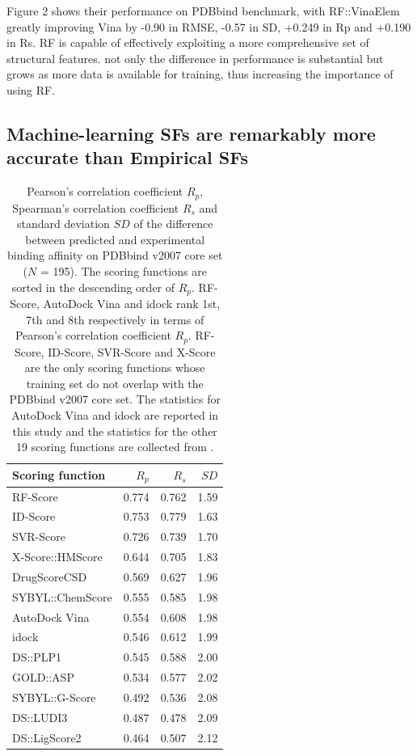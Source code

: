 \documentclass[journal=jacsat,manuscript=article]{achemso}
\begin{document}
Figure 2 shows their performance on PDBbind benchmark, with RF::VinaElem greatly improving Vina by -0.90 in RMSE, -0.57 in SD, +0.249 in Rp and +0.190 in Rs.
RF is capable of effectively exploiting a more comprehensive set of structural features.
not only the difference in performance is substantial but grows as more data is available for training, thus increasing the importance of using RF.

\subsection{Machine-learning SFs are remarkably more accurate than Empirical SFs}

\begin{table}
\caption{Pearson's correlation coefficient $R_p$, Spearman's correlation coefficient $R_s$ and standard deviation $SD$ of the difference between predicted and experimental binding affinity on PDBbind v2007 core set ($N$ = 195). The scoring functions are sorted in the descending order of $R_p$. RF-Score, AutoDock Vina and idock rank 1st, 7th and 8th respectively in terms of Pearson's correlation coefficient $R_p$. RF-Score, ID-Score, SVR-Score and X-Score are the only scoring functions whose training set do not overlap with the PDBbind v2007 core set. The statistics for AutoDock Vina and idock are reported in this study and the statistics for the other 19 scoring functions are collected from \cite{1313,564,1305,1295}.}
\label{tbl:sf}
\begin{tabular}{lrrr}
\hline
Scoring function & $R_p$ & $R_s$ & $SD$\\
\hline
RF-Score & 0.774 & 0.762 & 1.59\\
ID-Score & 0.753 & 0.779 & 1.63\\
SVR-Score & 0.726 & 0.739 & 1.70\\
X-Score::HMScore & 0.644 & 0.705 & 1.83\\
DrugScoreCSD & 0.569 & 0.627 & 1.96\\
SYBYL::ChemScore & 0.555 & 0.585 & 1.98\\
AutoDock Vina & 0.554 & 0.608 & 1.98\\
idock & 0.546 & 0.612 & 1.99\\
DS::PLP1 & 0.545 & 0.588 & 2.00\\
GOLD::ASP & 0.534 & 0.577 & 2.02\\
SYBYL::G-Score & 0.492 & 0.536 & 2.08\\
DS::LUDI3 & 0.487 & 0.478 & 2.09\\
DS::LigScore2 & 0.464 & 0.507 & 2.12\\

\end{tabular}
\end{table}
\end{document}
